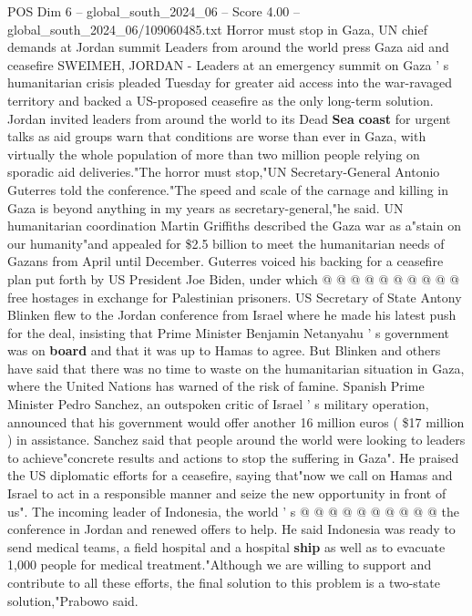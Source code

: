 \begin{textsample}{POS Dim 6 – global\_south\_2024\_06 – Score 4.00 – global\_south\_2024\_06/109060485.txt}  \label{ex:f6_pos_158}
Horror must stop in Gaza, UN chief demands at Jordan summit Leaders from around the world press Gaza aid and ceasefire SWEIMEH, JORDAN - Leaders at an emergency summit on Gaza ' s humanitarian crisis pleaded Tuesday for greater aid access into the war-ravaged territory and backed a US-proposed ceasefire as the only long-term solution.
Jordan invited leaders from around the world to its Dead \textbf{Sea} \textbf{coast} for urgent talks as aid groups warn that conditions are worse than ever in Gaza, with virtually the whole population of more than two million people relying on sporadic aid deliveries."The horror must stop,"UN Secretary-General Antonio Guterres told the conference."The speed and scale of the carnage and killing in Gaza is beyond anything in my years as secretary-general,"he said.
UN humanitarian coordination Martin Griffiths described the Gaza war as a"stain on our humanity"and appealed for \$2.5 billion to meet the humanitarian needs of Gazans from April until December.
Guterres voiced his backing for a ceasefire plan put forth by US President Joe Biden, under which @ @ @ @ @ @ @ @ @ @ free hostages in exchange for Palestinian prisoners.
US Secretary of State Antony Blinken flew to the Jordan conference from Israel where he made his latest push for the deal, insisting that Prime Minister Benjamin Netanyahu ' s government was on \textbf{board} and that it was up to Hamas to agree.
But Blinken and others have said that there was no time to waste on the humanitarian situation in Gaza, where the United Nations has warned of the risk of famine.
Spanish Prime Minister Pedro Sanchez, an outspoken critic of Israel ' s military operation, announced that his government would offer another 16 million euros ( \$17 million ) in assistance.
Sanchez said that people around the world were looking to leaders to achieve"concrete results and actions to stop the suffering in Gaza".
He praised the US diplomatic efforts for a ceasefire, saying that"now we call on Hamas and Israel to act in a responsible manner and seize the new opportunity in front of us".
The incoming leader of Indonesia, the world ' s @ @ @ @ @ @ @ @ @ @ the conference in Jordan and renewed offers to help.
He said Indonesia was ready to send medical teams, a field hospital and a hospital \textbf{ship} as well as to evacuate 1,000 people for medical treatment."Although we are willing to support and contribute to all these efforts, the final solution to this problem is a two-state solution,"Prabowo said.

\end{textsample}
